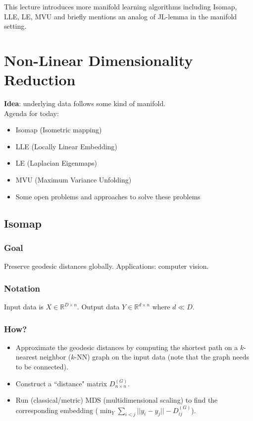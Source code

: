 This lecture introduces more manifold learning algorithms including
Isomap, LLE, LE, MVU and briefly mentions an analog of JL-lemma in the
manifold setting. 

\section{Non-Linear Dimensionality Reduction}
\textbf{Idea}: underlying data follows some kind of manifold.\\
Agenda for today:
\begin{itemize}
\item Isomap (Isometric mapping)
\item LLE (Locally Linear Embedding)
\item LE (Laplacian Eigenmaps)
\item MVU (Maximum Variance Unfolding)
\item Some open problems and approaches to solve these problems
\end{itemize}

\subsection{Isomap}
\subsubsection*{Goal}
Preserve geodesic distances globally. Applications: computer vision. 

\subsubsection*{Notation}
Input data is $X \in \mathbb{R}^{D\times n}$. Output data $Y \in
\mathbb{R}^{d\times n}$ where $d\ll D$. 

\subsubsection*{How?}
\begin{itemize}
\item Approximate the geodesic distances by computing the shortest
  path on a $k$-nearest neighbor ($k$-NN) graph on the input data
  (note that the graph needs to be connected). 
\item Construct a ``distance" matrix $D^{(G)}_{n\times n}$.
\item Run (classical/metric) MDS (multidimensional scaling) to find
  the corresponding embedding ($\min_{Y} \sum_{i<j}||y_i - y_j|| -
  D^{(G)}_{ij}$). 
\end{itemize}

